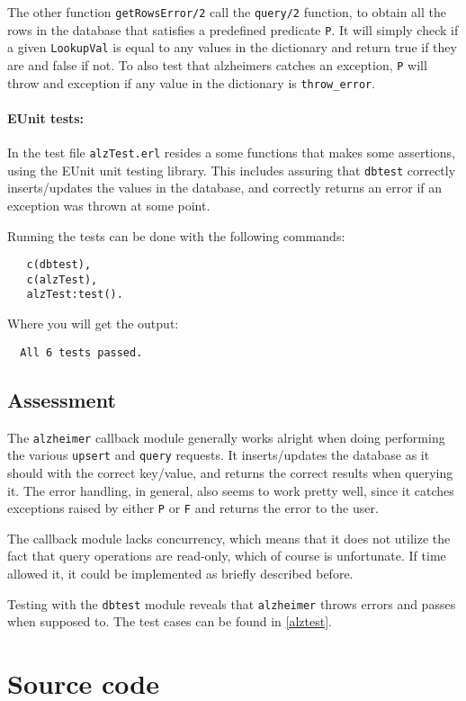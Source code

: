 \documentclass[a4paper]{article}
\begin{document}
The other function \texttt{getRowsError/2} call the \texttt{query/2} function, to obtain all the rows in the database that satisfies a predefined predicate \texttt{P}. It will simply check if a given \texttt{LookupVal} is equal to any values in the dictionary and return true if they are and false if not. To also test that alzheimers catches an exception, \texttt{P} will throw and exception if any value in the dictionary is \texttt{throw\_error}.
\paragraph{EUnit tests:}
\label{par:EUnit tests}
In the test file \texttt{alzTest.erl} resides a some functions that makes some assertions, using the EUnit unit testing library. This includes assuring that \texttt{dbtest} correctly inserts/updates the values in the database, and correctly returns an error if an exception was thrown at some point.

Running the tests can be done with the following commands:
\begin{verbatim}
   c(dbtest),
   c(alzTest),
   alzTest:test().
\end{verbatim}
Where you will get the output:
\begin{verbatim}
  All 6 tests passed.
\end{verbatim}
\subsection{Assessment}
\label{sub:Assessment_alz}
The \texttt{alzheimer} callback module generally works alright when doing performing the various \texttt{upsert} and \texttt{query} requests. It inserts/updates the database as it should with the correct key/value, and returns the correct results when querying it.
The error handling, in general, also seems to work pretty well, since it catches exceptions raised by either \texttt{P} or \texttt{F} and returns the error to the user.

The callback module lacks concurrency, which means that it does not utilize the fact that query operations are read-only, which of course is unfortunate. If time allowed it, it could be implemented as briefly described before.

Testing with the \texttt{dbtest} module reveals that \texttt{alzheimer} throws errors and passes when supposed to. The test cases can be found in \ref{alztest}.
\newpage
\appendix
\section{Source code}
\label{sec:Source code}
\end{document}
